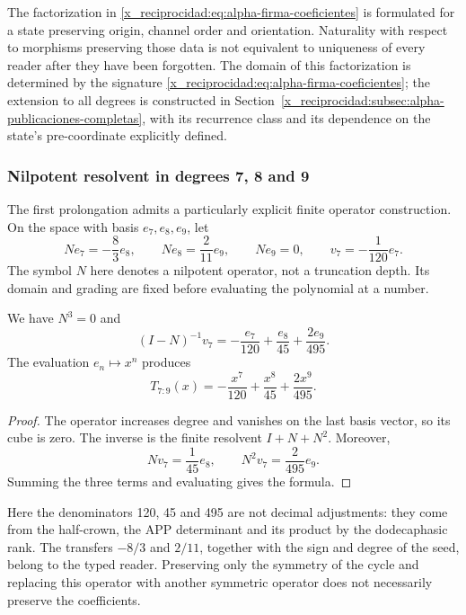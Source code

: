 The factorization in \eqref{x_reciprocidad:eq:alpha-firma-coeficientes} is formulated
for a state preserving origin, channel order and orientation.
Naturality with respect to morphisms preserving those data is not equivalent to
uniqueness of every reader after they have been forgotten. The domain of this
factorization is determined by the signature
\eqref{x_reciprocidad:eq:alpha-firma-coeficientes}; the extension to all degrees
is constructed in Section~\ref{x_reciprocidad:subsec:alpha-publicaciones-completas},
with its recurrence class and its dependence on the state's pre-coordinate
explicitly defined.

\subsubsection{Nilpotent resolvent in degrees 7, 8 and 9}
\label{x_reciprocidad:subsec:alpha-resolvente}

The first prolongation admits a particularly explicit finite operator
construction. On the space with basis \(e_7,e_8,e_9\),
let
\[
 Ne_7=-\frac83e_8,\qquad Ne_8=\frac2{11}e_9,\qquad Ne_9=0,
 \qquad v_7=-\frac1{120}e_7.
\]
The symbol \(N\) here denotes a nilpotent operator, not a truncation
depth. Its domain and grading are fixed before evaluating
the polynomial at a number.

\begin{lemma}
\label{x_reciprocidad:lem:alpha-resolvente}
We have \(N^3=0\) and
\[
 (I-N)^{-1}v_7
 =-\frac{e_7}{120}+\frac{e_8}{45}+\frac{2e_9}{495}.
\]
The evaluation \(e_n\mapsto x^n\) produces
\begin{equation}
 T_{7:9}(x)=-\frac{x^7}{120}+\frac{x^8}{45}+\frac{2x^9}{495}.
 \label{x_reciprocidad:eq:alpha-t79}
\end{equation}
\end{lemma}

\begin{proof}
The operator increases degree and vanishes on the last basis vector,
so its cube is zero. The inverse is the finite resolvent
\(I+N+N^2\). Moreover,
\[
 Nv_7=\frac1{45}e_8,\qquad N^2v_7=\frac2{495}e_9.
\]
Summing the three terms and evaluating gives the formula.
\end{proof}

Here the denominators 120, 45 and 495 are not decimal adjustments: they come
from the half-crown, the APP determinant and its product by the dodecaphasic
rank. The transfers \(-8/3\) and \(2/11\), together with the
sign and degree of the seed, belong to the typed reader. Preserving
only the symmetry of the cycle and replacing this operator with another symmetric
operator does not necessarily preserve the coefficients.

